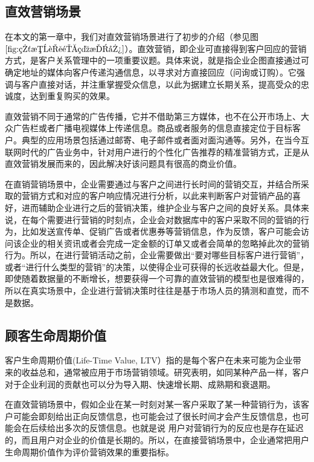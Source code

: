 \subsection{直效营销场景}
在本文的第一章中，我们对直效营销场景进行了初步的介绍（参见图$\ref{fig:直效营销示意图}$）。直效营销，即企业可直接得到客户回应的营销方式，是客户关系管理中的一项重要议题。具体来说，就是指企业企图直接通过可确定地址的媒体向客户传递沟通信息，以寻求对方直接回应（问询或订购）。它强调与客户直接对话，并注重掌握受众信息，以此为据建立长期关系，提高受众的忠诚度，达到重复购买的效果。

直效营销不同于通常的广告传播，它并不借助第三方媒体，也不在公开市场上、大众广告栏或者广播电视媒体上传递信息。商品或者服务的信息直接定位于目标客户。典型的应用场景包括通过邮寄、电子邮件或者面对面沟通等。另外，在当今互联网时代的广告业务中，针对用户进行的个性化广告推荐的精准营销方式，正是从直效营销发展而来的，因此解决好该问题具有很高的商业价值。

在直销营销场景中，企业需要通过与客户之间进行长时间的营销交互，并结合所采取的营销方式和对应的客户响应情况进行分析，以此来判断客户对营销产品的喜好，进而辅助企业进行之后的营销决策，维护企业与客户之间的良好关系。具体来说，在每个需要进行营销的时刻点，企业会对数据库中的客户采取不同的营销的行为，比如发送宣传单、促销广告或者优惠券等营销信息，作为反馈，客户可能会访问该企业的相关资讯或者会完成一定金额的订单又或者会简单的忽略掉此次的营销行为。所以，在进行营销活动之前，企业需要做出“要对哪些目标客户进行营销”，或者“进行什么类型的营销”的决策，以使得企业可获得的长远收益最大化。但是，即使随着数据量的不断增长，想要获得一个可靠的直效营销的模型也是很难得的，所以在真实场景中，企业进行营销决策时往往是基于市场人员的猜测和直觉，而不是数据\citep{tkachenko2015autonomous}。

\subsection{顾客生命周期价值}
客户生命周期价值(Life-Time Value, LTV）指的是每个客户在未来可能为企业带来的收益总和，通常被应用于市场营销领域。研究表明，如同某种产品一样，客户对于企业利润的贡献也可以分为导入期、快速增长期、成熟期和衰退期\citep{王广宇2013客户关系管理}。

在直效营销场景中，假如企业在某一时刻对某一客户采取了某一种营销行为，该客户可能会即刻给出正向反馈信息，也可能会过了很长时间才会产生反馈信息，也可能会在后续给出多次的反馈信息。也就是说
用户对营销行为的反应也是存在延迟的，而且用户对企业的价值是长期的。所以，在直接营销场景中，企业通常把用户生命周期价值作为评价营销效果的重要指标\citep{dwyer1997customer}。

